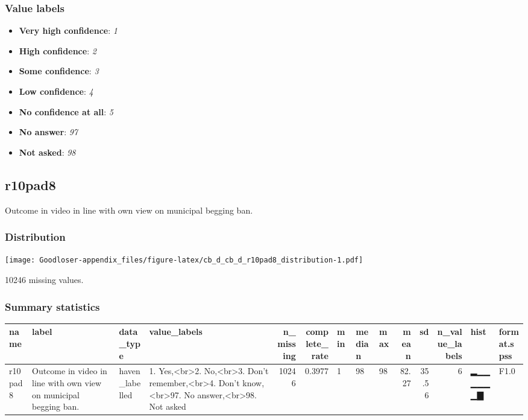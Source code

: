 \documentclass[
]{book}
\providecommand{\tightlist}{%
  \setlength{\itemsep}{0pt}\setlength{\parskip}{0pt}}
\begin{document}
\hypertarget{r10pad7_labels}{%
\subsubsection{Value labels}\label{r10pad7_labels}}

\begin{itemize}
\tightlist
\item
  \textbf{Very high confidence}: \emph{1}
\item
  \textbf{High confidence}: \emph{2}
\item
  \textbf{Some confidence}: \emph{3}
\item
  \textbf{Low confidence}: \emph{4}
\item
  \textbf{No confidence at all}: \emph{5}
\item
  \textbf{No answer}: \emph{97}
\item
  \textbf{Not asked}: \emph{98}
\end{itemize}

\hypertarget{r10pad8}{%
\subsection{r10pad8}\label{r10pad8}}

Outcome in video in line with own view on municipal begging ban.

\hypertarget{r10pad8_distribution}{%
\subsubsection{Distribution}\label{r10pad8_distribution}}

\texttt{[image: Goodloser-appendix\_files/figure-latex/cb\_d\_cb\_d\_r10pad8\_distribution-1.pdf]}

10246 missing values.

\hypertarget{r10pad8_summary}{%
\subsubsection{Summary statistics}\label{r10pad8_summary}}

\begin{tabular}{l|l|l|l|r|r|l|l|l|r|r|r|l|l}
\hline
name & label & data_type & value_labels & n_missing & complete_rate & min & median & max & mean & sd & n_value_labels & hist & format.spss\\
\hline
r10pad8 & Outcome in video in line with own view on municipal begging ban. & haven_labelled & 1. Yes,<br>2. No,<br>3. Don't remember,<br>4. Don't know,<br>97. No answer,<br>98. Not asked & 10246 & 0.3977 & 1 & 98 & 98 & 82.27 & 35.56 & 6 & ▂▁▁▁▁▁▁▇ & F1.0\\
\hline
\end{tabular}
\end{document}
